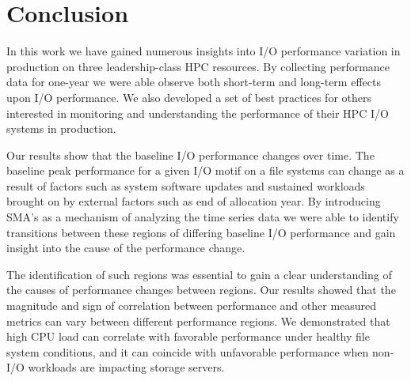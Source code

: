 \section{Conclusion} \label{sec:conclusions}

% 
% 
%
% 
%
%
%
% 
% 


In this work we have gained numerous insights into I/O performance variation
in production on three leadership-class HPC resources. By collecting
performance data for one-year we were able observe both short-term and
long-term effects upon I/O performance. We also developed a set of best
practices for others interested in monitoring and understanding the performance of their HPC I/O systems in production.

Our results show that the baseline I/O performance changes over time. The
baseline peak performance for a given I/O motif on a file systems can change
as a result of factors such as system software updates and sustained
workloads brought on by external factors such as end of allocation year. By introducing SMA's as a mechanism of analyzing the time series data we were able to identify transitions between these regions of differing baseline I/O performance and gain insight into the cause of the performance change. 

The identification of such regions was essential to gain a clear understanding of the causes of performance changes between regions. Our results showed that the magnitude and sign of correlation between performance and other measured metrics can vary between different performance regions.
We demonstrated that high CPU load can correlate with favorable performance under healthy file system conditions, and it can coincide with unfavorable performance when non-I/O workloads are impacting storage servers.

